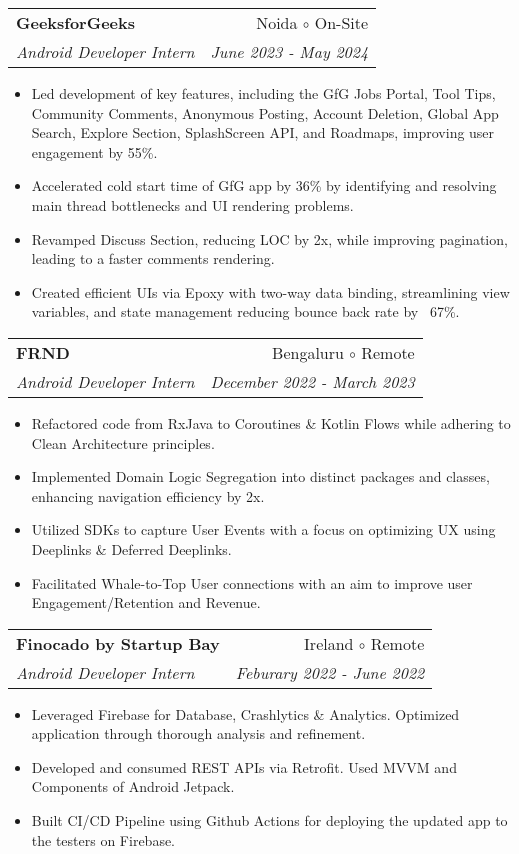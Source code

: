 \documentclass[apaper,20pt]{article}
\makeatletter
\newcommand{\resumeSubheading}[4]{
  \vspace{-1pt}\item
    \begin{tabular*}{0.97\textwidth}{l@{\extracolsep{\fill}}r}
      \textbf{#1} & #2 \\
      \textit{#3} & \textit{#4} \\
    \end{tabular*}\vspace{-5pt}
}
\makeatother
\begin{document}
\resumeSubheading
{GeeksforGeeks}{Noida $\circ$ On-Site}
{Android Developer Intern }{June 2023 - May 2024}
\begin{itemize}
    \item {Led development of key features, including the GfG Jobs Portal, Tool Tips, Community Comments, Anonymous Posting, Account Deletion, Global App Search, Explore Section, SplashScreen API, and Roadmaps, improving user engagement by 55\%.}
    \item {Accelerated cold start time of GfG app by 36\% by identifying and resolving main thread bottlenecks and UI rendering problems.}
	\item {Revamped Discuss Section, reducing LOC by 2x, while improving pagination, leading to a faster comments rendering.}
	\item {Created efficient UIs via Epoxy with two-way data binding, streamlining view variables, and state management reducing bounce back rate by ~67\%.}
\end{itemize}
\vspace{-3pt}

\resumeSubheading
{FRND}{Bengaluru $\circ$ Remote}
{Android Developer Intern }{December 2022 - March 2023}
\begin{itemize}
	\item {Refactored code from RxJava to Coroutines \& Kotlin Flows while adhering to Clean Architecture principles.}
    \item {Implemented Domain Logic Segregation into distinct packages and classes, enhancing navigation efficiency by 2x.}
	\item {Utilized SDKs to capture User Events with a focus on optimizing UX using Deeplinks \& Deferred Deeplinks.}
	\item {Facilitated Whale-to-Top User connections with an aim to improve user Engagement/Retention and Revenue.}
\end{itemize}
\vspace{-3pt}

\resumeSubheading
{Finocado by Startup Bay}{Ireland $\circ$ Remote}
{Android Developer Intern }{Feburary 2022 - June 2022}
\begin{itemize}
    \item {Leveraged Firebase for Database, Crashlytics \& Analytics. Optimized application through thorough analysis and refinement.}
	\item {Developed and consumed REST APIs via Retrofit. Used MVVM and Components of Android Jetpack.}
	\item {Built CI/CD Pipeline using Github Actions for deploying the updated app to the testers on Firebase.}
\end{itemize}
\vspace{-3pt}
\end{document}
